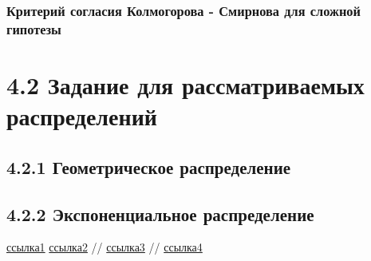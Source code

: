 \documentclass[a4paper,12pt, oneside]{book}
\begin{document}
\subsection{Критерий согласия Колмогорова - Смирнова для сложной гипотезы}







\chapter{4.2 Задание для рассматриваемых распределений}

\section{4.2.1 Геометрическое распределение}

\section{4.2.2 Экспоненциальное распределение}







\begin{thebibliography}{99}
	 \href{http://www.complexdoc.ru/ntdpdf/541018/prikladnaya_statistika_pravila_proverki_soglasiya_opytnogo_raspredeleniya.pdf}{ссылка1}
	  \href{https://www.statisticshowto.datasciencecentral.com/exponential-distribution/}{ссылка2}
	  // \href{http://www.ams.jhu.edu/~dan/550.435/notes/COURSENOTES435.pdf}{ссылка3}
	  // \href{http://www.obzh.ru/nad/4-3.html}{ссылка4}
\end{thebibliography}
\end{document}
